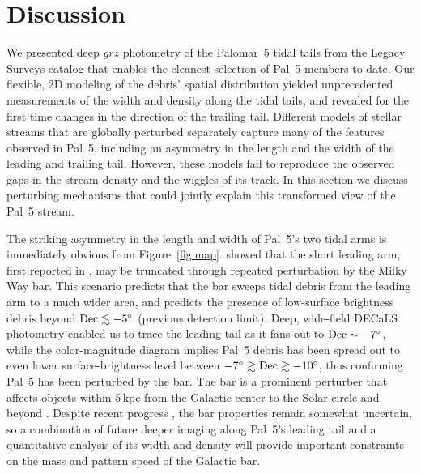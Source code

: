 \documentclass[twocolumn]{aastex62}
\newcommand{\ab}[1]{{\color{teal} AB: #1}}
\begin{document}
%
%
%




\section{Discussion}
\label{sec:discussion}
We presented deep $grz$ photometry of the Palomar~5 tidal tails from the Legacy Surveys catalog that enables the cleanest selection of Pal~5 members to date.
Our flexible, 2D modeling of the debris' spatial distribution yielded unprecedented measurements of the width and density along the tidal tails, and revealed for the first time changes in the direction of the trailing tail.
Different models of stellar streams that are globally perturbed separately capture many of the features observed in Pal~5, including an asymmetry in the length and the width of the leading and trailing tail.
However, these models fail to reproduce the observed gaps in the stream density and the wiggles of its track.
In this section we discuss perturbing mechanisms that could jointly explain this transformed view of the Pal~5 stream.

The striking asymmetry in the length and width of Pal~5's two tidal arms is immediately obvious from Figure~\ref{fig:map}.
\citet{Pearson:2017} showed that the short leading arm, first reported in \citet{Bernard:2016}, may be truncated through repeated perturbation by the Milky Way bar. 
This scenario predicts that the bar sweeps tidal debris from the leading arm to a much wider area, and predicts the presence of low-surface brightness debris beyond $\rm Dec\lesssim-5^\circ$ (previous detection limit).
Deep, wide-field DECaLS photometry enabled us to trace the leading tail as it fans out to $\rm Dec\sim-7^\circ$, while the color-magnitude diagram implies Pal~5 debris has been spread out to even lower surface-brightness level between $-7^\circ\gtrsim\rm Dec\gtrsim-10^\circ$, thus confirming Pal~5 has been perturbed by the bar.
The bar is a prominent perturber that affects objects within 5\,kpc from the Galactic center \citep[e.g., the Ophiuchus stream,][]{Price-Whelan:2016b, Hattori:2016} to the Solar circle and beyond \citep[e.g., local phase-space overdensities][]{Hunt:2018, Monari:2019}.
Despite recent progress \citep[e.g.,][]{Clarke:2019, Sanders:2019}, the bar properties remain somewhat uncertain, so a combination of future deeper imaging along Pal~5's leading tail and a quantitative analysis of its width and density will provide important constraints on the mass and pattern speed of the Galactic bar.
\end{document}
